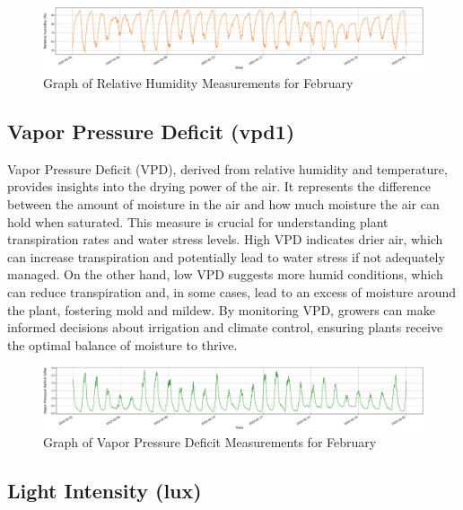 \begin{figure}[htbp]
    \centering
    \includegraphics[width=15 cm]{4_ChapterMaterials/figuras/train_data_Relative_humidity.pdf}
    \caption{Graph of Relative Humidity Measurements for February}
    \end{figure}

\subsection{Vapor Pressure Deficit (vpd1)}

Vapor Pressure Deficit (VPD), derived from relative humidity and temperature, provides insights into the drying power of the air. It represents the difference between the amount of moisture in the air and how much moisture the air can hold when saturated. This measure is crucial for understanding plant transpiration rates and water stress levels. High VPD indicates drier air, which can increase transpiration and potentially lead to water stress if not adequately managed. On the other hand, low VPD suggests more humid conditions, which can reduce transpiration and, in some cases, lead to an excess of moisture around the plant, fostering mold and mildew. By monitoring VPD, growers can make informed decisions about irrigation and climate control, ensuring plants receive the optimal balance of moisture to thrive.

\begin{figure}[htbp]
    \centering
    \includegraphics[width=15 cm]{4_ChapterMaterials/figuras/train_data_Vapor_Pressure_Deficit.pdf}
    \caption{Graph of Vapor Pressure Deficit Measurements for February}
    \end{figure}

\subsection{Light Intensity (lux)}

